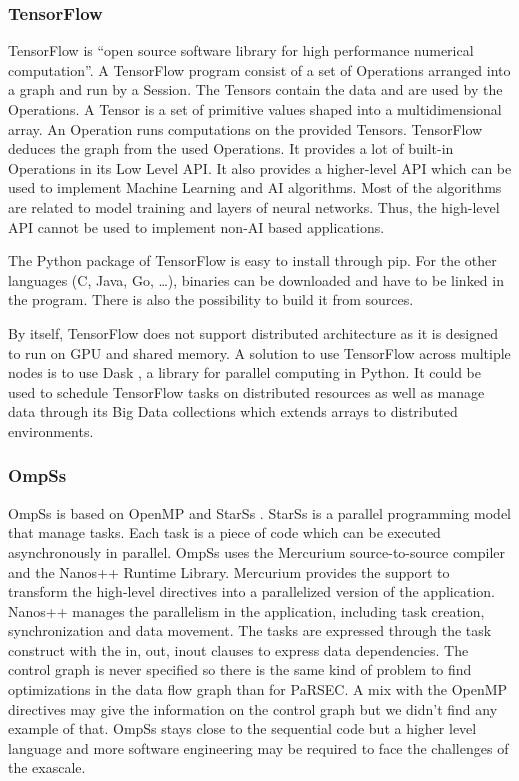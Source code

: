 \subsubsection{TensorFlow}
TensorFlow \cite{AABBC2016} is “open source software library for high performance numerical computation”.
A TensorFlow program consist of a set of Operations arranged into a graph and run by a Session.
The Tensors contain the data and are used by the Operations.
A Tensor is a set of primitive values shaped into a multidimensional array.
An Operation runs computations on the provided Tensors.
TensorFlow deduces the graph from the used Operations.
It provides a lot of built-in Operations in its Low Level API.
It also provides a higher-level API which can be used to implement Machine Learning and AI algorithms.
Most of the algorithms are related to model training and layers of neural networks.
Thus, the high-level API cannot be used to implement non-AI based applications.

The Python package of TensorFlow is easy to install through pip.
For the other languages (C, Java, Go, \dots), binaries can be downloaded and have to be linked in the program.
There is also the possibility to build it from sources.

By itself, TensorFlow does not support distributed architecture as it is designed to run on GPU and shared memory.
A solution to use TensorFlow across multiple nodes is to use Dask \cite{Dask2016}, a library for parallel computing in Python.
It could be used to schedule TensorFlow tasks on distributed resources as well as manage data through its Big Data collections which extends arrays to distributed environments.

\subsubsection{OmpSs}
OmpSs \cite{DABLM2011} is based on OpenMP \cite{DaguM1998} and StarSs \cite{PerRL2007}.
StarSs is a parallel programming model that manage tasks.
Each task is a piece of code which can be executed asynchronously in parallel.
OmpSs uses the Mercurium source-to-source compiler and the Nanos++ Runtime Library.
Mercurium provides the support to transform the high-level directives into a parallelized version of the application.
Nanos++ manages the parallelism in the application, including task creation, synchronization and data movement.
The tasks are expressed through the task construct with the in, out, inout clauses to express data dependencies.
The control graph is never specified so there is the same kind of problem to find optimizations in the data flow graph than for PaRSEC.
A mix with the OpenMP directives may give the information on the control graph but we didn't find any example of that.
OmpSs stays close to the sequential code but a higher level language and more software engineering may be required to face the challenges of the exascale.


